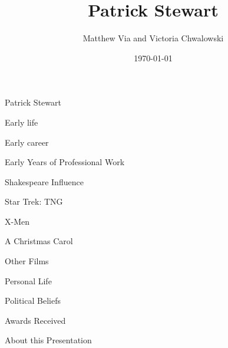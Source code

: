 \documentclass[xcolor=dvipsnames]{beamer}
\begin{document}
\author{Matthew Via and Victoria Chwalowski}
\title{Patrick Stewart}
\date{\today}
\begin{frame}{Patrick Stewart}

\end{frame}
\begin{frame}{Early life}

\end{frame}
\begin{frame}{Early career}

\end{frame}
\begin{frame}{Early Years of Professional Work}

\end{frame}
\begin{frame}{Shakespeare Influence}

\end{frame}
\begin{frame}{Star Trek: TNG}

\end{frame}
\begin{frame}{X-Men}

\end{frame}
\begin{frame}{A Christmas Carol}

\end{frame}
\begin{frame}{Other Films}

\end{frame}
\begin{frame}{Personal Life}

\end{frame}
\begin{frame}{Political Beliefs}

\end{frame}
\begin{frame}{Awards Received}

\end{frame}
\begin{frame}{About this Presentation}

\end{frame}
\end{document}
